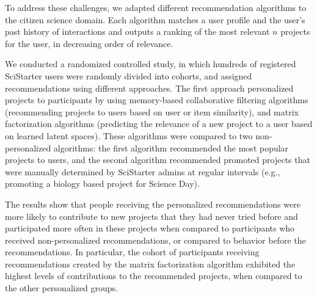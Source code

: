 \documentclass[letterpaper]{article} %
\begin{document}
 To address these challenges, we adapted  different recommendation algorithms to the citizen science domain. Each algorithm matches a user profile and the user's past history of interactions and outputs a ranking of the most relevant $n$  projects   for the user, in decreasing order of relevance.




We conducted a randomized controlled study, in which hundreds of registered SciStarter users were randomly divided into cohorts, 
and 
assigned recommendations using different approaches.
The first approach personalized projects to participants by  using  memory-based collaborative filtering algorithms  (recommending projects to users based on user or item similarity),  and matrix factorization algorithms (predicting the 
relevance of a new  project to a user based on learned latent spaces). 
These algorithms were compared to two non-personalized algorithms: 
the first algorithm recommended the most popular projects to users, and the second algorithm 
recommended  promoted    projects that were manually determined by  SciStarter admins at regular intervals (e.g., promoting a biology based project for Science Day).

The results show that  people receiving the personalized recommendations  were more likely  to contribute to new projects that they had never tried before and participated more often in 
these projects  when compared to participants who received non-personalized recommendations, or compared to behavior before 
the recommendations. In particular, the cohort of participants receiving recommendations created by the matrix factorization algorithm exhibited the highest levels of contributions to the recommended projects, when compared to the other personalized groups. 
\end{document}
